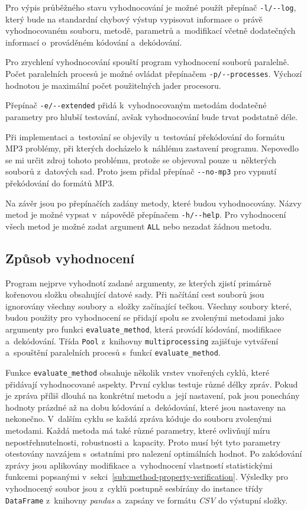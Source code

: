Pro výpis průběžného stavu vyhodnocování je možné použít přepínač
\verb|-l/--log|, který bude na standardní chybový výstup vypisovat informace
o~právě vyhodnocovaném souboru, metodě, parametrů a~modifikací včetně
dodatečných informací o~prováděném kódování a~dekódování.

Pro zrychlení vyhodnocování spouští program vyhodnocení souborů paralelně.
Počet paralelních procesů je možné ovládat přepínačem \verb|-p/--processes|.
Výchozí hodnotou je maximální počet použitelných jader procesoru.

Přepínač \verb|-e/--extended| přidá k~vyhodnocovaným metodám dodatečné
parametry pro hlubší testování, avšak vyhodnocování bude trvat podstatně déle.

Při implementaci a~testování se objevily u~testování překódování do formátu MP3
problémy, při kterých docházelo k~náhlému zastavení programu. Nepovedlo se mi
určit zdroj tohoto problému, protože se objevoval pouze u~některých souborů
z~datových sad. Proto jsem přidal přepínač \verb|--no-mp3| pro vypnutí
překódování do formátů MP3.

Na závěr jsou po přepínačích zadány metody, které budou vyhodnocovány. Názvy
metod je možné vypsat v~nápovědě přepínačem \verb|-h/--help|. Pro vyhodnocení
všech metod je možné zadat argument \texttt{ALL} nebo nezadat žádnou metodu.

\subsection*{Způsob vyhodnocení}
\label{sub:evaluation-program}

Program nejprve vyhodnotí zadané argumenty, ze kterých zjistí primárně
kořenovou složku obsahující datové sady. Při načítání cest souborů jsou
ignorovány všechny soubory a~složky začínající tečkou. Všechny soubory které,
budou použity pro vyhodnocení se přidají spolu se zvolenými metodami jako
argumenty pro funkci \texttt{evaluate\_method}, která provádí kódování,
modifikace a~dekódování. Třída \texttt{Pool} z~knihovny
\texttt{multiprocessing} zajišťuje vytváření a~spouštění paralelních procesů
s~funkcí \texttt{evaluate\_method}.

Funkce \texttt{evaluate\_method} obsahuje několik vrstev vnořených cyklů, které
přidávají vyhodnocované aspekty. První cyklus testuje různé délky zpráv. Pokud
je zpráva příliš dlouhá na konkrétní metodu a~její nastavení, pak jsou
ponechány hodnoty prázdné až na dobu kódování a~dekódování, které jsou
nastaveny na nekonečno. V~dalším cyklu se každá zpráva kóduje do souboru
zvolenými metodami. Každá metoda má také různé parametry, které ovlivňují míru
nepostřehnutelnosti, robustnosti a~kapacity. Proto musí být tyto parametry
otestovány navzájem s~ostatními pro nalezení optimálních hodnot. Po zakódování
zprávy jsou aplikovány modifikace a~vyhodnocení vlastností statistickými
funkcemi popsanými v~sekci~\ref{sub:method-property-verification}. Výsledky pro
vyhodnocený soubor jsou z~cyklů postupně sesbírány do instance třídy
\texttt{DataFrame} z~knihovny \textit{pandas} a~zapsány ve formátu \textit{CSV}
do výstupní složky.

